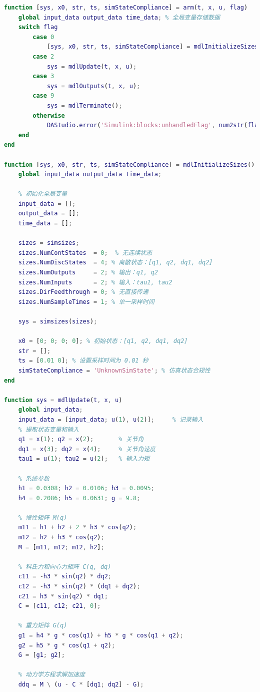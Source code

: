 \documentclass[12pt,a4paper,UTF8]{article}
\begin{document}
\begin{lstlisting}[language=Matlab,caption=arm.m——2-DOF 机械臂的物理模型 S-function实现]
function [sys, x0, str, ts, simStateCompliance] = arm(t, x, u, flag)
    global input_data output_data time_data; % 全局变量存储数据
    switch flag
        case 0
            [sys, x0, str, ts, simStateCompliance] = mdlInitializeSizes();
        case 2
            sys = mdlUpdate(t, x, u);
        case 3
            sys = mdlOutputs(t, x, u);
        case 9
            sys = mdlTerminate();
        otherwise
            DAStudio.error('Simulink:blocks:unhandledFlag', num2str(flag));
    end
end

function [sys, x0, str, ts, simStateCompliance] = mdlInitializeSizes()
    global input_data output_data time_data;

    % 初始化全局变量
    input_data = [];
    output_data = [];
    time_data = [];

    sizes = simsizes;
    sizes.NumContStates  = 0;  % 无连续状态
    sizes.NumDiscStates  = 4; % 离散状态：[q1, q2, dq1, dq2]
    sizes.NumOutputs     = 2; % 输出：q1, q2
    sizes.NumInputs      = 2; % 输入：tau1, tau2
    sizes.DirFeedthrough = 0; % 无直接传递
    sizes.NumSampleTimes = 1; % 单一采样时间

    sys = simsizes(sizes);

    x0 = [0; 0; 0; 0]; % 初始状态：[q1, q2, dq1, dq2]
    str = [];
    ts = [0.01 0]; % 设置采样时间为 0.01 秒
    simStateCompliance = 'UnknownSimState'; % 仿真状态合规性
end

function sys = mdlUpdate(t, x, u)
    global input_data;
    input_data = [input_data; u(1), u(2)];     % 记录输入
    % 提取状态变量和输入
    q1 = x(1); q2 = x(2);       % 关节角
    dq1 = x(3); dq2 = x(4);     % 关节角速度
    tau1 = u(1); tau2 = u(2);   % 输入力矩

    % 系统参数
    h1 = 0.0308; h2 = 0.0106; h3 = 0.0095;
    h4 = 0.2086; h5 = 0.0631; g = 9.8;

    % 惯性矩阵 M(q)
    m11 = h1 + h2 + 2 * h3 * cos(q2);
    m12 = h2 + h3 * cos(q2);
    M = [m11, m12; m12, h2];

    % 科氏力和向心力矩阵 C(q, dq)
    c11 = -h3 * sin(q2) * dq2;
    c12 = -h3 * sin(q2) * (dq1 + dq2);
    c21 = h3 * sin(q2) * dq1;
    C = [c11, c12; c21, 0];

    % 重力矩阵 G(q)
    g1 = h4 * g * cos(q1) + h5 * g * cos(q1 + q2);
    g2 = h5 * g * cos(q1 + q2);
    G = [g1; g2];

    % 动力学方程求解加速度
    ddq = M \ (u - C * [dq1; dq2] - G);


\end{lstlisting}
\end{document}
